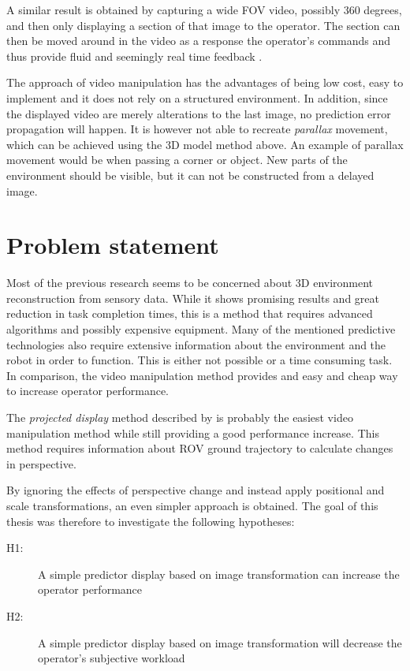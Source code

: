 A similar result is obtained by capturing a wide FOV video, possibly 360 degrees, and then only displaying a section of that image to the operator. The section can then be moved around in the video as a response the operator's commands and thus provide fluid and seemingly real time feedback \citep{Baldwin1999}.

The approach of video manipulation has the advantages of being low cost, easy to implement and it does not rely on a structured environment. In addition, since the displayed video are merely alterations to the last image, no prediction error propagation will happen. It is however not able to recreate \textit{parallax} movement, which can be achieved using the 3D model method above. An example of parallax movement would be when passing a corner or object. New parts of the environment should be visible, but it can not be constructed from a delayed image.

\section{Problem statement}

Most of the previous research seems to be concerned about 3D environment reconstruction from sensory data. While it shows promising results and great reduction in task completion times, this is a method that requires advanced algorithms and possibly expensive equipment. Many of the mentioned predictive technologies also require extensive information about the environment and the robot in order to function. This is either not possible or a time consuming task. In comparison, the video manipulation method provides and easy and cheap way to increase operator performance.

The \textit{projected display} method described by \citet{Matheson2013} is probably the easiest video manipulation method while still providing a good performance increase. This method requires information about ROV ground trajectory to calculate changes in perspective. 

By ignoring the effects of perspective change and instead apply positional and scale transformations, an even simpler approach is obtained. The goal of this thesis was therefore to investigate the following hypotheses:

\begin{description}
\item[H1:] A simple predictor display based on image transformation can increase the operator performance
 
 \item[H2:] A simple predictor display based on image transformation will decrease the operator's subjective workload
\end{description}

